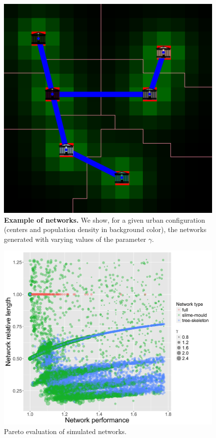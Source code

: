 \documentclass[runningheads,a4paper]{llncs2e/llncs}
\begin{document}
\begin{figure}
	\includegraphics[width=0.32\linewidth]{figures/bionw_territ6_gamma1_8.png}
	\caption{\textbf{Example of networks.} We show, for a given urban configuration (centers and population density in background color), the networks generated with varying values of the parameter $\gamma$.}
\end{figure}







\begin{figure}
	\includegraphics[width=1.2\linewidth]{figures/paretoSpeedLength.png}
	\caption{Pareto evaluation of simulated networks.}
\end{figure}
\end{document}
